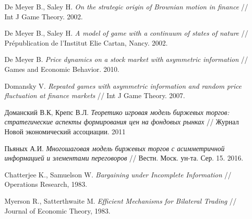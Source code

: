 \documentclass{beamer}
\begin{document}
\begin{thebibliography}{99}
  De Meyer B., Saley H. \emph{On the strategic origin of Brownian motion in
    finance} // Int J Game Theory. 2002.
 
%
  De Meyer B., Saley H. \emph{A model of game with a continuum of states of
    nature} // Pr\'{e}publication de l’Institut Elie Cartan, Nancy. 2002.
  
%
  De Meyer B. \emph{Price dynamics on a stock market with asymmetric
    information} // Games and Economic Behavior. 2010.
  
%
  Domansky V. \emph{Repeated games with asymmetric information and random price
  fluctuation at finance markets} // Int J Game Theory. 2007.

%
  Доманский В.К, Крепс В.Л. \emph{Теоретико игровая модель биржевых торгов:
    стратегические аспекты формирования цен на фондовых рынках} // Журнал Новой
  экономический ассоциации. 2011

%
  Пьяных А.И. \emph{Многошаговая модель биржевых торгов с асимметричной
    информацией и элементами переговоров} // Вестн. Моск. ун-та. Сер. 15. 2016.
  
%
  Chatterjee K., Samuelson W. \emph{Bargaining under Incomplete Information} //
  Operations Research, 1983.
  
%
  Myerson R., Satterthwaite M. \emph{Efficient Mechanisms for Bilateral Trading}
  // Journal of Economic Theory, 1983.

\end{thebibliography}
\end{document}
